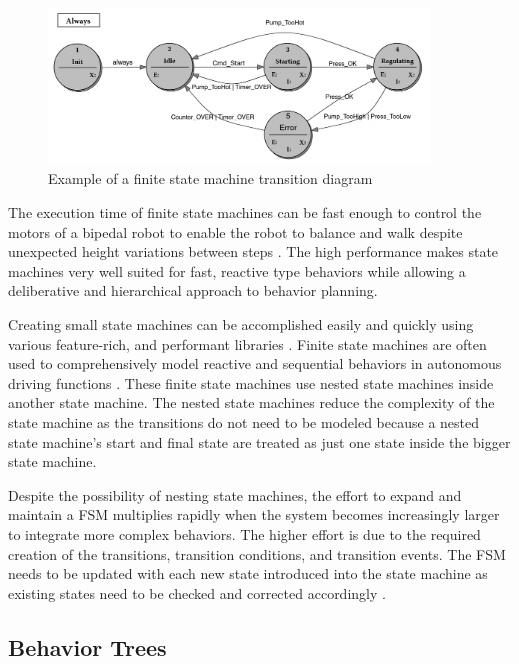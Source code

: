 \begin{figure}[ht]
	\centering
	\includegraphics[width=0.9\textwidth]{images/fsm.png} 
	\caption{Example of a finite state machine transition diagram \cite{wagner2006}}
	\label{fig:fsm}
\end{figure}

The execution time of finite state machines can be fast enough to control the motors of a bipedal robot to enable the robot to balance and walk despite unexpected height variations between steps \cite{park2013}. The high performance makes state machines very well suited for fast, reactive type behaviors while allowing a deliberative and hierarchical approach to behavior planning.

Creating small state machines can be accomplished easily and quickly using various feature-rich, and performant libraries \cite{fourakis2014}. Finite state machines are often used to comprehensively model reactive and sequential behaviors in autonomous driving functions \cite{ziegler2014}. These finite state machines use nested state machines inside another state machine. The nested state machines reduce the complexity of the state machine as the transitions do not need to be modeled because a nested state machine's start and final state are treated as just one state inside the bigger state machine. 

Despite the possibility of nesting state machines, the effort to expand and maintain a FSM multiplies rapidly when the system becomes increasingly larger to integrate more complex behaviors. The higher effort is due to the required creation of the transitions, transition conditions, and transition events. The FSM needs to be updated with each new state introduced into the state machine as existing states need to be checked and corrected accordingly \cite{conner2017}. 
%

\subsection{Behavior Trees}
\label{subsec:Behavior Trees}

